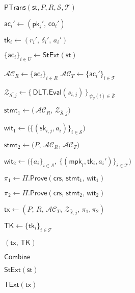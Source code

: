 \begin{minipage}[t]{0.49\textwidth}
\begin{algo}{$\mathsf{PTrans}(\mathsf{st},P,R,\mathcal{S},\mathcal{T})$}
{  $\mathsf{ac}_i' \gets (\mathsf{pk}_i',\, \mathsf{co}_i')$\;
  
  $\mathsf{tk}_i \gets (r_i',\, \delta_i',\, a_i')$\;
}

$\{\mathsf{ac}_i\}_{i\in U} \gets \mathsf{StExt}(\mathsf{st})$\;

$\mathcal{AC}_R \gets \{\mathsf{ac}_i\}_{i\in R}$\;
$\mathcal{AC}_T \gets \{\mathsf{ac}_i'\}_{i\in \mathcal{T}}$\;

$\mathcal{Z}_{\bar{\mathcal{S},j}} \gets \{\, \mathsf{DLT.Eval}(s_{i,j})\,\}_{\,\psi_{\mathcal{S}}(i)\in \bar{\mathcal{S}}}$\;

$\mathsf{stmt}_1 \gets \big(\, \mathcal{AC}_R,\, \mathcal{Z}_{\bar{\mathcal{S}},j}\big)$\;

$\mathsf{wit}_1 \gets \big( \{(\mathsf{sk}_{i,j},a_i)\}_{i\in \mathcal{S}}\big)$\;

$\mathsf{stmt}_2 \gets \big(P,\, \mathcal{AC}_R,\, \mathcal{AC}_T\big)$\;

$\mathsf{wit}_2 \gets \big( \{a_i\}_{i\in \mathcal{S}},\ \{(\mathsf{mpk}_i,\mathsf{tk}_i,a_i')\}_{i\in \mathcal{T}} \big)$\;

$\pi_1 \gets \Pi.\mathsf{Prove}(\mathsf{crs},\, \mathsf{stmt}_1,\, \mathsf{wit}_1)$\;

$\pi_2 \gets \Pi.\mathsf{Prove}(\mathsf{crs},\, \mathsf{stmt}_2,\, \mathsf{wit}_2)$\;

$\mathsf{tx} \gets (P,\, R,\, \mathcal{AC}_T,\, \mathcal{Z}_{\bar{\mathcal{S}},j},\, \pi_1,\pi_2)$\;

$\mathsf{TK} \gets \{\mathsf{tk}_i\}_{i\in \mathcal{T}}$\;

\Return $(\mathsf{tx},\, \mathsf{TK})$\;
\end{algo}

\begin{algo}{$\mathsf{Combine}$}
\end{algo}

\begin{algo}{$\mathsf{StExt}(\mathsf{st})$}
\end{algo}

\begin{algo}{$\mathsf{TExt}(\mathsf{tx})$}
\end{algo}

\end{minipage}\hfill
